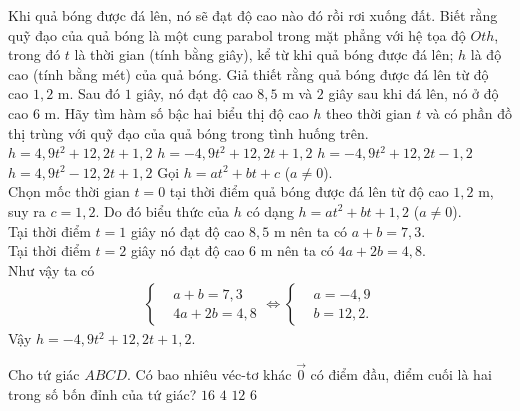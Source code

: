 \begin{ex}%
	Khi quả bóng được đá lên, nó sẽ đạt độ cao nào đó rồi rơi xuống đất. Biết rằng quỹ đạo của quả bóng là một cung parabol trong mặt phẳng với hệ tọa độ $Oth$, trong đó $t$ là thời gian (tính bằng giây), kể từ khi quả bóng được đá lên; $h$ là độ cao (tính bằng mét) của quả bóng. Giả thiết rằng quả bóng được đá lên từ độ cao $1{,}2$ m. Sau đó $1$ giây, nó đạt độ cao $8{,}5$ m và $2$ giây sau khi đá lên, nó ở độ cao $6$ m. Hãy tìm hàm số bậc hai biểu thị độ cao $h$ theo thời gian $t$ và có phần đồ thị trùng với quỹ đạo của quả bóng trong tình huống trên.
	\choice
	{$h=4{,}9t^2 + 12{,}2t + 1{,}2$}
	{\True $h=-4{,}9t^2 + 12{,}2t + 1{,}2$}
	{$h=-4{,}9t^2 + 12{,}2t - 1{,}2$}
	{$h=4{,}9t^2 - 12{,}2t + 1{,}2$}
	\loigiai
	{
		Gọi $h=at^2+bt+c$ ($a\neq 0$).\\
		Chọn mốc thời gian $t=0$ tại thời điểm quả bóng được đá lên từ độ cao $1{,}2$ m, suy ra $c=1{,}2$. Do đó biểu thức của $h$ có dạng $h=at^2+bt+1{,}2$ ($a\neq 0$).\\
		Tại thời điểm $t=1$ giây nó đạt độ cao $8{,}5$ m nên ta có $a+b=7{,}3$.\\
		Tại thời điểm $t=2$ giây nó đạt độ cao $6$ m nên ta có $4a+2b=4{,}8$.\\
		Như vậy ta có
		\begin{eqnarray*}
			\left\{\begin{aligned}&a+b=7{,}3 \\&4a+2b=4{,}8\end{aligned}\right. \Leftrightarrow \left\{\begin{aligned}&a=-4{,}9 \\&b=12{,}2.  \end{aligned}\right.
		\end{eqnarray*}
		Vậy $h=-4{,}9t^2 + 12{,}2t + 1{,}2$.
	}
\end{ex} 
\begin{ex}%
	Cho tứ giác $ABCD$. Có bao nhiêu véc-tơ khác $\overrightarrow{0}$ có điểm đầu, điểm cuối là hai trong số bốn đỉnh của tứ giác?
	\choice
	{$16$}
	{$4$}
	{\True $12$}
	{$6$}
\end{ex}
